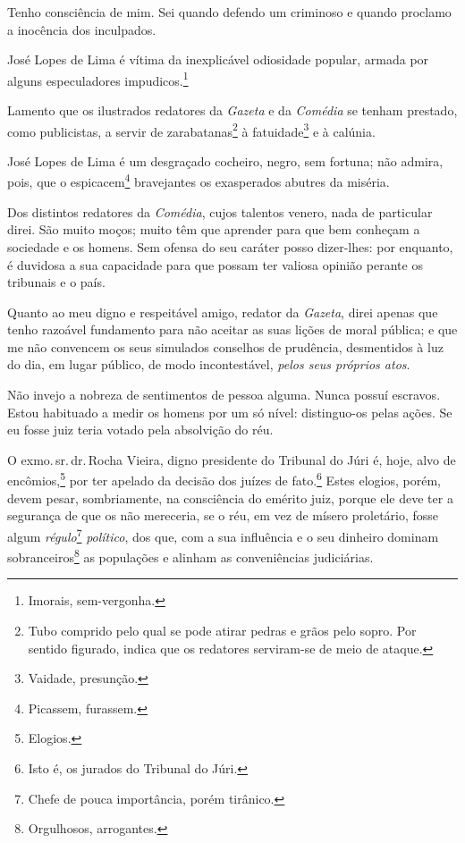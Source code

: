 {Tenho consciência de mim. Sei quando defendo um criminoso e quando
proclamo a inocência dos inculpados.

José Lopes de Lima é vítima da inexplicável odiosidade popular, armada
por alguns especuladores impudicos.\footnote{Imorais, sem-vergonha.}

Lamento que os ilustrados redatores da \textit{Gazeta} e da \textit{Comédia}
se tenham prestado, como publicistas, a servir de zarabatanas\footnote{Tubo comprido pelo qual se pode atirar
    pedras e grãos pelo sopro. Por sentido figurado, indica que os
    redatores serviram-se de meio de ataque.} à fatuidade\footnote{
    Vaidade, presunção.} e à calúnia. 

José Lopes de Lima é um desgraçado cocheiro, negro, sem fortuna; não
admira, pois, que o espicacem\footnote{Picassem, furassem.}
bravejantes os exasperados abutres da miséria.

Dos distintos redatores da \textit{Comédia}, cujos talentos venero, nada
de particular direi. São muito moços; muito têm que aprender para que
bem conheçam a sociedade e os homens. Sem ofensa do seu caráter posso
dizer-lhes: por enquanto, é duvidosa a sua capacidade para que possam
ter valiosa opinião perante os tribunais e o país.

Quanto ao meu digno e respeitável amigo, redator da \textit{Gazeta}, direi
apenas que tenho razoável fundamento para não aceitar as suas lições de
moral pública; e que me não convencem os seus simulados conselhos de
prudência, desmentidos à luz do dia, em lugar público, de modo
incontestável, \emph{pelos seus próprios atos}.

Não invejo a nobreza de sentimentos de pessoa alguma. Nunca possuí
escravos. Estou habituado a medir os homens por um só nível:
distinguo-os pelas ações. Se eu fosse juiz teria votado pela absolvição
do réu.

O exmo.\,sr.\,dr.\,Rocha Vieira, digno presidente do Tribunal do Júri é,
hoje, alvo de encômios,\footnote{Elogios.} por ter apelado da decisão
dos juízes de fato.\footnote{Isto é, os jurados do Tribunal do Júri.}
Estes elogios, porém, devem pesar, sombriamente, na consciência do
emérito juiz, porque ele deve ter a segurança de que os não mereceria,
se o réu, em vez de mísero proletário, fosse algum
\emph{régulo}\footnote{Chefe de pouca importância, porém tirânico.}
\emph{político}, dos que, com a sua influência e o seu dinheiro dominam
sobranceiros\footnote{Orgulhosos, arrogantes.}
as populações e alinham as
conveniências judiciárias.

}
